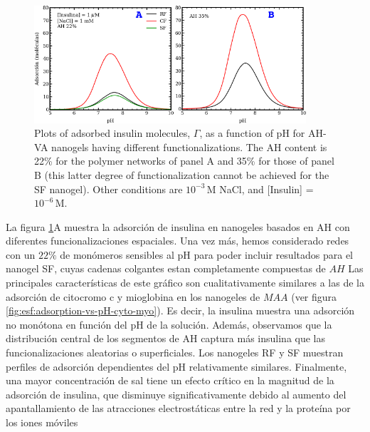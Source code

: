 \begin{figure}[!htb]
    \centering
    \includegraphics[width=0.9\textwidth]{Figures/graphs-gel2/insu-PAH.pdf}
    \caption{Plots of adsorbed insulin molecules, $\Gamma$, as a function of pH for  AH-VA nanogels having different functionalizations.
    The AH content is 22\% for the polymer networks of panel A and 35\% for those of panel B (this latter degree of functionalization cannot be achieved for the SF nanogel).
    Other conditions are $10^{-3}$\,M NaCl, and [Insulin] = $10^{-6}$\,M.}
    \label{fig:esf:adsorption-vs-pH-insulin}
\end{figure}




La figura \ref{fig:esf:adsorption-vs-pH-insulin}A muestra la adsorci\'on de insulina en nanogeles basados en AH con diferentes funcionalizaciones espaciales.
Una vez m\'as, hemos considerado redes con un $22\%$ de mon\'omeros sensibles al pH para poder incluir resultados para el nanogel SF, cuyas cadenas colgantes estan completamente compuestas  de $AH$
Las principales caracter\'isticas de este gr\'afico son cualitativamente similares a las de la adsorci\'on de citocromo c y mioglobina en los nanogeles de $MAA$ (ver figura \ref{fig:esf:adsorption-vs-pH-cyto-myo}).
Es decir, la insulina muestra una adsorci\'on no mon\'otona en función del pH de la soluci\'on.
Adem\'as, observamos que la distribuci\'on central de los segmentos de AH captura m\'as insulina que las funcionalizaciones aleatorias o superficiales.
Los nanogeles RF y SF muestran perfiles de adsorci\'on dependientes del pH relativamente similares.
Finalmente, una mayor concentraci\'on de sal tiene un efecto cr\'itico en la magnitud de la adsorci\'on de insulina, que disminuye significativamente debido al aumento del apantallamiento de las atracciones electrost\'aticas entre la red y la prote\'ina por los iones m\'oviles

